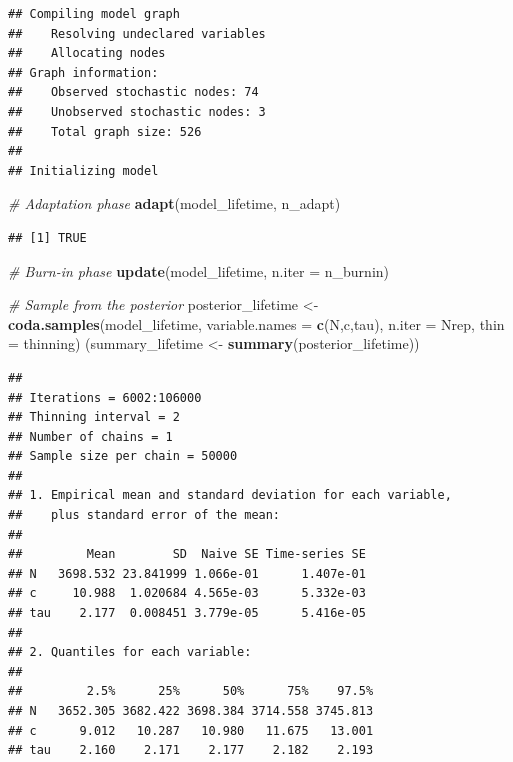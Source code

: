 \documentclass[
]{article}
\newenvironment{Shaded}{\begin{snugshade}}{\end{snugshade}}
\newcommand{\AttributeTok}[1]{\textcolor[rgb]{0.13,0.29,0.53}{#1}}
\newcommand{\CommentTok}[1]{\textcolor[rgb]{0.56,0.35,0.01}{\textit{#1}}}
\newcommand{\FunctionTok}[1]{\textcolor[rgb]{0.13,0.29,0.53}{\textbf{#1}}}
\newcommand{\NormalTok}[1]{#1}
\newcommand{\OtherTok}[1]{\textcolor[rgb]{0.56,0.35,0.01}{#1}}
\newcommand{\StringTok}[1]{\textcolor[rgb]{0.31,0.60,0.02}{#1}}
\begin{document}
\begin{verbatim}
## Compiling model graph
##    Resolving undeclared variables
##    Allocating nodes
## Graph information:
##    Observed stochastic nodes: 74
##    Unobserved stochastic nodes: 3
##    Total graph size: 526
## 
## Initializing model
\end{verbatim}

\begin{Shaded}
\begin{Highlighting}[]
\CommentTok{\# Adaptation phase}
\FunctionTok{adapt}\NormalTok{(model\_lifetime, n\_adapt)}
\end{Highlighting}
\end{Shaded}

\begin{verbatim}
## [1] TRUE
\end{verbatim}

\begin{Shaded}
\begin{Highlighting}[]
\CommentTok{\# Burn{-}in phase}
\FunctionTok{update}\NormalTok{(model\_lifetime, }\AttributeTok{n.iter =}\NormalTok{ n\_burnin)}

\CommentTok{\# Sample from the posterior}
\NormalTok{posterior\_lifetime }\OtherTok{\textless{}{-}} \FunctionTok{coda.samples}\NormalTok{(model\_lifetime, }\AttributeTok{variable.names =} \FunctionTok{c}\NormalTok{(}\StringTok{\textquotesingle{}N\textquotesingle{}}\NormalTok{,}\StringTok{\textquotesingle{}c\textquotesingle{}}\NormalTok{,}\StringTok{\textquotesingle{}tau\textquotesingle{}}\NormalTok{), }\AttributeTok{n.iter =}\NormalTok{ Nrep, }\AttributeTok{thin =}\NormalTok{ thinning)}
\NormalTok{(summary\_lifetime }\OtherTok{\textless{}{-}} \FunctionTok{summary}\NormalTok{(posterior\_lifetime))}
\end{Highlighting}
\end{Shaded}

\begin{verbatim}
## 
## Iterations = 6002:106000
## Thinning interval = 2 
## Number of chains = 1 
## Sample size per chain = 50000 
## 
## 1. Empirical mean and standard deviation for each variable,
##    plus standard error of the mean:
## 
##         Mean        SD  Naive SE Time-series SE
## N   3698.532 23.841999 1.066e-01      1.407e-01
## c     10.988  1.020684 4.565e-03      5.332e-03
## tau    2.177  0.008451 3.779e-05      5.416e-05
## 
## 2. Quantiles for each variable:
## 
##         2.5%      25%      50%      75%    97.5%
## N   3652.305 3682.422 3698.384 3714.558 3745.813
## c      9.012   10.287   10.980   11.675   13.001
## tau    2.160    2.171    2.177    2.182    2.193
\end{verbatim}
\end{document}
